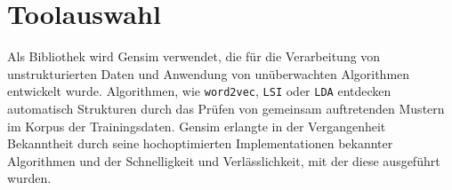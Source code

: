 \documentclass[german,version-2020-11]{uzl-thesis}
\begin{document}
\section{Toolauswahl}
Als Bibliothek wird Gensim verwendet, die für die Verarbeitung von unstrukturierten Daten und Anwendung von unüberwachten Algorithmen entwickelt wurde. Algorithmen, wie \lstinline{word2vec}, \lstinline{LSI} oder \lstinline{LDA} entdecken automatisch Strukturen durch das Prüfen von gemeinsam auftretenden Mustern im Korpus der Trainingsdaten. Gensim erlangte in der Vergangenheit Bekanntheit durch seine hochoptimierten Implementationen bekannter Algorithmen und der Schnelligkeit und Verlässlichkeit, mit der diese ausgeführt wurden.


\end{document}
